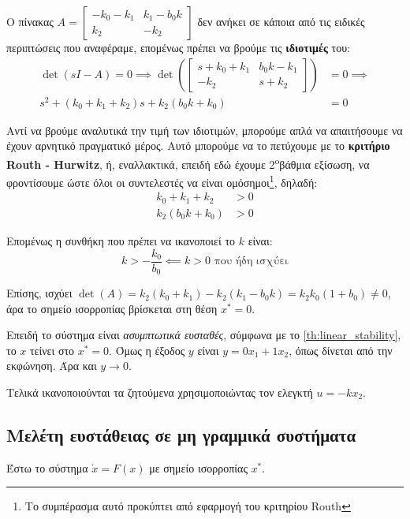 \documentclass[11pt,a4paper,notitlepage,fleqn]{article}
\begin{document}
\begin{exercise}[Παράδειγμα]
	Ο πίνακας \( A=\left[\begin{matrix}
	-k_0 - k_1 & k_1-b_0k \\
	k_2 & -k_2
	\end{matrix}\right] \) δεν ανήκει σε κάποια από τις ειδικές περιπτώσεις
	που αναφέραμε, επομένως πρέπει να βρούμε τις \textbf{ιδιοτιμές} του:
	\begin{align*}
	\det(sI-A) = 0 \implies \det\left(\left[\begin{matrix}
	s+k_0+k_1 & b_0k-k_1 \\ -k_2 & s+k_2 \end{matrix}
	\right]\right) &= 0 \implies \\
	s^2 + (k_0+k_1+k_2)s + k_2(b_0k + k_0) &= 0
	\end{align*}
	
	Αντί να βρούμε αναλυτικά την τιμή των ιδιοτιμών, μπορούμε απλά να
	απαιτήσουμε να έχουν αρνητικό πραγματικό μέρος. Αυτό μπορούμε να το
	πετύχουμε με το \textbf{κριτήριο Routh - Hurwitz}, ή, εναλλακτικά, επειδή
	εδώ έχουμε 2\textsuperscript{o}βάθμια εξίσωση, να φροντίσουμε ώστε όλοι
	οι συντελεστές να είναι ομόσημοι\footnote{Το συμπέρασμα αυτό προκύπτει από εφαρμογή του κριτηρίου Routh}, δηλαδή:
	\begin{align*}
		k_0+k_1+k_2 &> 0\\
		k_2(b_0k+k_0) &> 0
	\end{align*}
	
	Επομένως η συνθήκη που πρέπει να ικανοποιεί το \( k \) είναι:
	\[
	k > -\frac{k_0}{b_0} \impliedby k>0 \text{ που ήδη ισχύει}
	\]
	
	Επίσης, ισχύει \( \det(A) = k_2(k_0+k_1)-k_2(k_1-b_0k) = k_2k_0(1+b_0) \neq 0 \), άρα το σημείο ισορροπίας βρίσκεται στη θέση \( x^* = 0 \).

	Επειδή το σύστημα είναι \textit{ασυμπτωτικά ευσταθές}, σύμφωνα
	με το \autoref{th:linear_stability}, το
	\( x \) τείνει στο \( x^* = 0 \). Όμως η έξοδος \( y \) είναι \( y=0x_1 + 1x_2 \), όπως δίνεται από την εκφώνηση.
	Άρα και \( y\to 0 \).
	
	Τελικά ικανοποιούνται τα ζητούμενα χρησιμοποιώντας τον ελεγκτή \( u=-kx_2 \).
\end{exercise}

\subsection{Μελέτη ευστάθειας σε μη γραμμικά συστήματα}
Έστω το σύστημα \( \dot x = F(x) \) με σημείο ισορροπίας \( x^* \).
\end{document}
